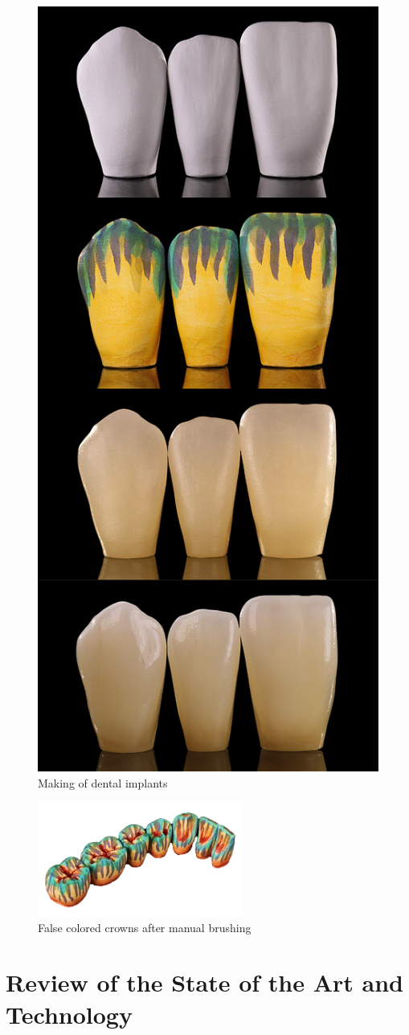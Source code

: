 \begin{figure}[h]
	\centering
	\includegraphics[height=0.6\textwidth]{grafiken/CrownProcesses.jpg}
	\caption{Making of dental implants \citep{zirkonzahn2018} }
	\label{fig:CrownProcesses}
\end{figure} 

\begin{figure}[h]
	\centering
	\includegraphics[width=0.6\textwidth]{grafiken/false_colored.png}
	\caption{False colored crowns after manual brushing \citep{zirkonzahn2018}}
	\label{fig:false_colored}
\end{figure}


\chapter{Review of the State of the Art and Technology}
\label{sec:kritik_stand_technik}
